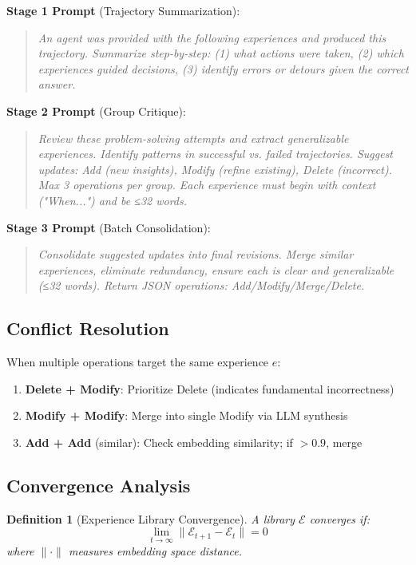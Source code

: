 \documentclass[11pt,letterpaper]{article}
\newtheorem{definition}{Definition}[section]
\begin{document}
\textbf{Stage 1 Prompt} (Trajectory Summarization):
\begin{quote}
\textit{An agent was provided with the following experiences and produced this trajectory. Summarize step-by-step: (1) what actions were taken, (2) which experiences guided decisions, (3) identify errors or detours given the correct answer.}
\end{quote}

\textbf{Stage 2 Prompt} (Group Critique):
\begin{quote}
\textit{Review these problem-solving attempts and extract generalizable experiences. Identify patterns in successful vs. failed trajectories. Suggest updates: Add (new insights), Modify (refine existing), Delete (incorrect). Max 3 operations per group. Each experience must begin with context ("When...") and be ≤32 words.}
\end{quote}

\textbf{Stage 3 Prompt} (Batch Consolidation):
\begin{quote}
\textit{Consolidate suggested updates into final revisions. Merge similar experiences, eliminate redundancy, ensure each is clear and generalizable (≤32 words). Return JSON operations: Add/Modify/Merge/Delete.}
\end{quote}

\subsection{Conflict Resolution}

When multiple operations target the same experience $e$:

\begin{enumerate}
    \item \textbf{Delete + Modify}: Prioritize Delete (indicates fundamental incorrectness)
    \item \textbf{Modify + Modify}: Merge into single Modify via LLM synthesis
    \item \textbf{Add + Add} (similar): Check embedding similarity; if $> 0.9$, merge
\end{enumerate}

\subsection{Convergence Analysis}

\begin{definition}[Experience Library Convergence]
A library $\mathcal{E}$ converges if:
\begin{equation}
\lim_{t \to \infty} \|\mathcal{E}_{t+1} - \mathcal{E}_t\| = 0
\end{equation}
where $\|\cdot\|$ measures embedding space distance.
\end{definition}
\end{document}

